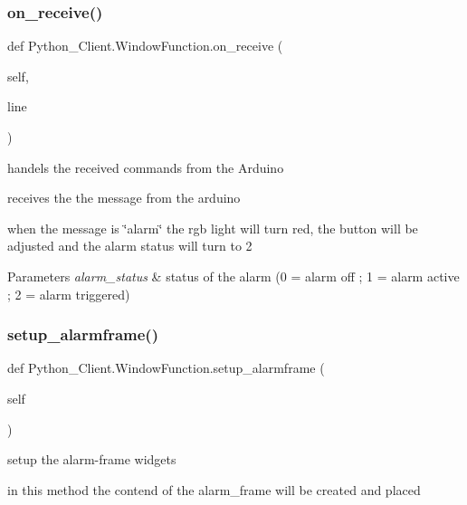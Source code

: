 \subsubsection{\texorpdfstring{on\+\_\+receive()}{on\_receive()}}
{\footnotesize\ttfamily def Python\+\_\+\+Client.\+Window\+Function.\+on\+\_\+receive (\begin{DoxyParamCaption}\item[{}]{self,  }\item[{}]{line }\end{DoxyParamCaption})}



handels the received commands from the Arduino 

receives the the message from the arduino

when the message is \char`\"{}alarm\char`\"{} the rgb light will turn red, the button will be adjusted and the alarm status will turn to 2


\begin{DoxyParams}{Parameters}
{\em alarm\+\_\+status} & status of the alarm (0 = alarm off ; 1 = alarm active ; 2 = alarm triggered) \\
\hline
\end{DoxyParams}
\mbox{\label{class_python___client_1_1_window_function_a625d8169e5b5f11c4dd7df8611ff1ad0}} 
\subsubsection{\texorpdfstring{setup\+\_\+alarmframe()}{setup\_alarmframe()}}
{\footnotesize\ttfamily def Python\+\_\+\+Client.\+Window\+Function.\+setup\+\_\+alarmframe (\begin{DoxyParamCaption}\item[{}]{self }\end{DoxyParamCaption})}



setup the alarm-\/frame widgets 

in this method the contend of the alarm\+\_\+frame will be created and placed


